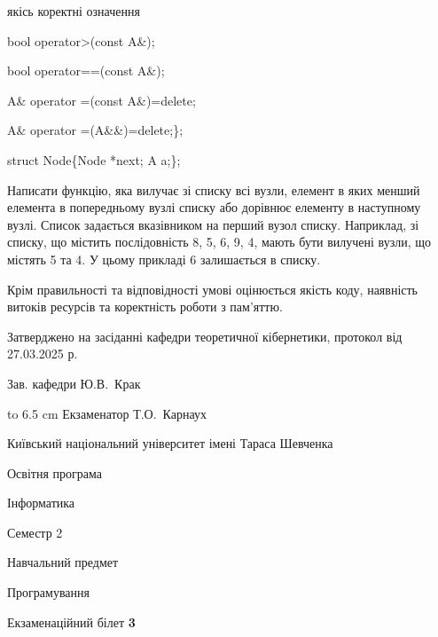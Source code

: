 \documentclass[12pt, ukrainian]{article}
\begin{document}
{\quad  якісь коректні означення 

\quad  bool operator>(const A\&); 

\quad  bool operator==(const A\&); 

\quad A\& operator =(const A\&)=delete; 

\quad  A\& operator =(A\&\&)=delete;\};

struct Node\{Node *next; A a;\};

 Написати функцію, яка вилучає зі списку всі вузли, елемент в яких менший елемента в попередньому вузлі списку або дорівнює елементу в наступному вузлі. Список задається вказівником на перший вузол списку. Наприклад, зі списку, що містить послідовність 8, 5, 6, 9, 4, мають бути вилучені вузли, що містять 5 та 4. У цьому прикладі 6 залишається в списку.

Крім правильності та відповідності умові оцінюється якість коду, наявність витоків ресурсів та коректність роботи з пам'яттю. 

}
{\smallskip\smallskip \begin {scriptsize} Затверджено на засіданні кафедри теоретичної кібернетики, протокол   від   27.03.2025 р.\par\smallskip\smallskip\smallskip\smallskip
{\parbox {6.5 cm} {Зав. кафедри \dotfill Ю.В.~Крак}}\hspace {0.7cm} {\hbox to 6.5 cm { Екзаменатор \dotfill Т.О.~Карнаух}} \end{scriptsize}}
\newpage
{{\begin {scriptsize}\par
{ \center  Київський національний університет імені Тараса Шевченка \par}
{\parbox {5 cm}{Освітня програма \hfill}{\parbox {7 cm}{Інформатика\hfill}}\parbox {6 cm}{\hfill Семестр 2}}\par
{\parbox {5 cm} {Навчальний предмет \hfill}\parbox {7 cm}{Програмування \hfill}\parbox {6cm}{\hfill}\par}\vspace{-15pt} \end{scriptsize}}{\center Екзаменаційний білет \No \textbf { 3 }\par}}
\end{document}
